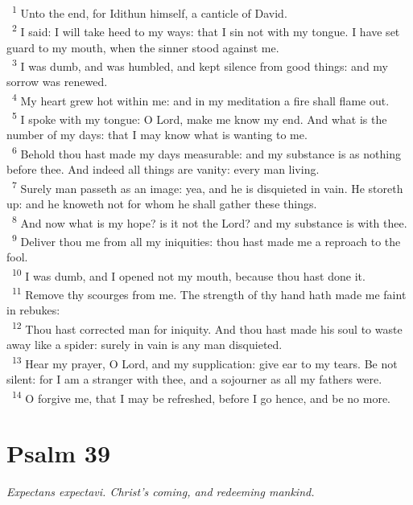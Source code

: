 \documentclass[a5paper,12pt]{article}
\begin{document}
\begin{multicols*}{2}
~\textsuperscript{1} Unto the end, for Idithun himself, a canticle of David.\\
~\textsuperscript{2} I said: I will take heed to my ways: that I sin not with my tongue. I have set guard to my mouth, when the sinner stood against me.\\
~\textsuperscript{3} I was dumb, and was humbled, and kept silence from good things: and my sorrow was renewed.\\
~\textsuperscript{4} My heart grew hot within me: and in my meditation a fire shall flame out.\\
~\textsuperscript{5} I spoke with my tongue: O Lord, make me know my end. And what is the number of my days: that I may know what is wanting to me.\\
~\textsuperscript{6} Behold thou hast made my days measurable: and my substance is as nothing before thee. And indeed all things are vanity: every man living.\\
~\textsuperscript{7} Surely man passeth as an image: yea, and he is disquieted in vain. He storeth up: and he knoweth not for whom he shall gather these things.\\
~\textsuperscript{8} And now what is my hope? is it not the Lord? and my substance is with thee.\\
~\textsuperscript{9} Deliver thou me from all my iniquities: thou hast made me a reproach to the fool.\\
~\textsuperscript{10} I was dumb, and I opened not my mouth, because thou hast done it.\\
~\textsuperscript{11} Remove thy scourges from me. The strength of thy hand hath made me faint in rebukes:\\
~\textsuperscript{12} Thou hast corrected man for iniquity. And thou hast made his soul to waste away like a spider: surely in vain is any man disquieted.\\
~\textsuperscript{13} Hear my prayer, O Lord, and my supplication: give ear to my tears. Be not silent: for I am a stranger with thee, and a sojourner as all my fathers were.\\
~\textsuperscript{14} O forgive me, that I may be refreshed, before I go hence, and be no more.\\

\section{Psalm 39}
\label{sec:orgec1418e}
\emph{Expectans expectavi. Christ's coming, and redeeming mankind.}\\


\end{multicols*}
\end{document}
